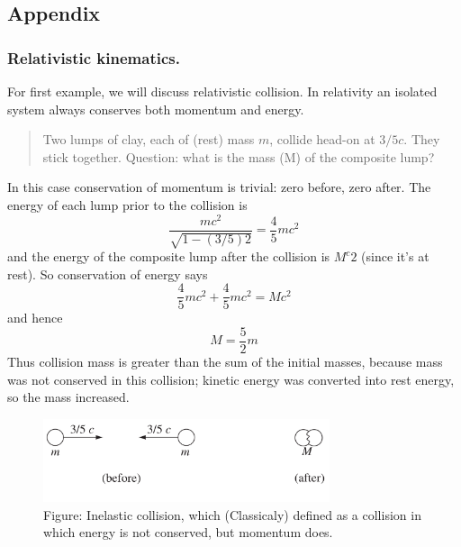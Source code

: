\documentclass[../main.tex]{subfiles}
\begin{document}
\subsection*{Appendix}
\subsubsection*{Relativistic kinematics.} For first example, we will discuss relativistic collision. In relativity an isolated system always conserves both momentum and energy. 
\begin{quote}
    Two lumps of clay, each of (rest) mass $m$, collide head-on at $3/5 c$. They stick together. Question: what is the mass (M) of the composite lump?
\end{quote}
In this case conservation of momentum is trivial: zero before, zero after. The energy of each lump prior to the collision is
\begin{equation*}
    \frac{mc^2}{\sqrt{1 - (3/5)2}}=\frac{4}{5}mc^2
\end{equation*}
and the energy of the composite lump after the collision is $M^c2$ (since it's at rest). So conservation of energy says
\begin{equation*}
    \frac{4}{5}mc^2+\frac{4}{5}mc^2=Mc^2
\end{equation*}
and hence
\begin{equation*}
    M=\frac{5}{2}m
\end{equation*}
Thus collision mass is greater than the sum of the initial masses, because mass was not conserved in this collision; kinetic energy was converted into rest energy, so the mass increased.
\begin{figure}[b]
    \centering
    \includegraphics[width=0.75\textwidth]{../Rss/Relativity/Appendix/Collision.png}
    \caption*{Figure: Inelastic collision, which (Classicaly) defined as a collision in which energy is not conserved, but momentum does.}
\end{figure}
\end{document}
